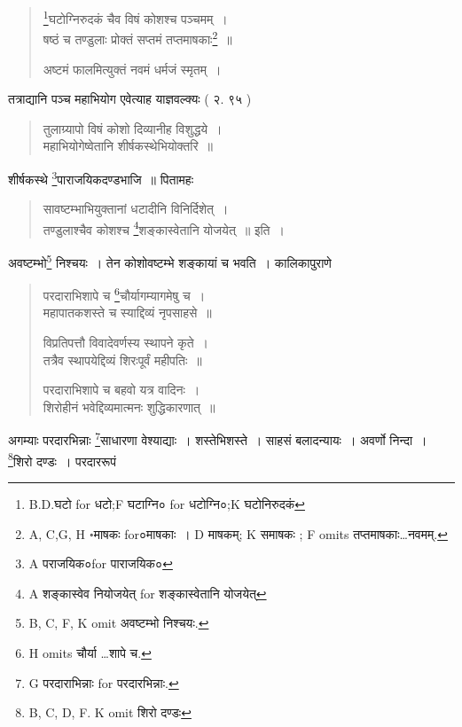 \documentclass[11pt, openany]{book}
\begin{document}
\newpage
{}
\fancyhead[LE]{$\S$ ७]}
\fancyhead[RO]{[$\S$ ७}

\begin{quote}
{\vy \renewcommand{\thefootnote}{1}\footnote{B.D.घटो for धटो;F घटाग्नि० for धटोग्नि०;K घटोनिरुदकं}घटोग्निरुदकं चैव विषं कोशश्च पञ्चमम्~।\\
षष्ठं च तण्डुलाः प्रोक्तं सप्तमं तप्तमाषकाः\renewcommand{\thefootnote}{2}\footnote{A, C,G, H ॰माषकः for०माषकाः~। D माषकम्; K समाषकः ; F omits तप्तमाषकाः\ldots नवमम्.}~॥

अष्टमं फालमित्युक्तं नवमं धर्मजं स्मृतम्~।}
\end{quote}

तत्राद्यानि पञ्च महाभियोग एवेत्याह याज्ञवल्क्यः ( २. ९५ )

\begin{quote}
{\vy तुलाग्र्यापो विषं कोशो दिव्यानीह विशुद्धये~।\\
महाभियोगेष्वेतानि शीर्षकस्थेभियोक्तरि~॥}
\end{quote}

शीर्षकस्थे \renewcommand{\thefootnote}{3}\footnote{A पराजयिक०for पाराजयिक०}पाराजयिकदण्डभाजि~॥ पितामहः

\begin{quote}
{\vy सावष्टम्भाभियुक्तानां धटादीनि विनिर्दिशेत्~।\\
तण्डुलाश्चैव कोशश्च \renewcommand{\thefootnote}{4}\footnote{A शङ्कास्वेव नियोजयेत् for शङ्कास्वेतानि योजयेत्}शङ्कास्वेतानि योजयेत्~॥} इति~।
\end{quote}

अवष्टम्भो\renewcommand{\thefootnote}{5}\footnote{B, C, F, K omit अवष्टम्भो निश्चयः.} निश्चयः~। तेन कोशोवष्टम्भे शङ्कायां च भवति~। कालिकापुराणे

\begin{quote}
{\vy परदाराभिशापे च \renewcommand{\thefootnote}{6}\footnote{H omits चौर्या \ldots शापे च.}चौर्यागम्यागमेषु च~।\\
महापातकशस्ते च स्याद्दिव्यं नृपसाहसे~॥

विप्रतिपत्तौ विवादेवर्णस्य स्थापने कृते~।\\
तत्रैव स्थापयेद्दिव्यं शिरःपूर्वं महीपतिः~॥

परदाराभिशापे च बहवो यत्र वादिनः~।\\
शिरोहीनं भवेद्दिव्यमात्मनः शुद्धिकारणात्~॥}
\end{quote}

अगम्याः परदारभिन्नाः \renewcommand{\thefootnote}{7}\footnote{G परदाराभिन्नाः for परदारभिन्नाः.}साधारणा वेश्याद्याः~। शस्तेभिशस्ते~। साहसं बलादन्यायः~। अवर्णो निन्दा~। \renewcommand{\thefootnote}{8}\footnote{B, C, D, F. K omit शिरो दण्डः}शिरो दण्डः~। परदाररूपं
\end{document}
